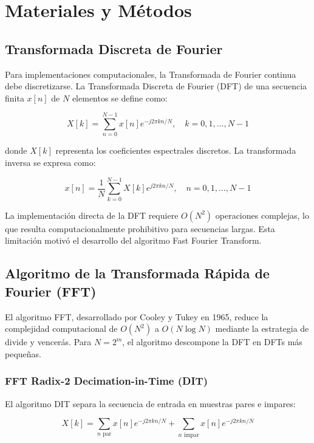 \documentclass[a4paper]{article}
\begin{document}
\section{Materiales y Métodos}

\subsection{Transformada Discreta de Fourier}

Para implementaciones computacionales, la Transformada de Fourier continua debe discretizarse. La Transformada Discreta de Fourier (DFT) de una secuencia finita $x[n]$ de $N$ elementos se define como:

\begin{equation}
X[k] = \sum_{n=0}^{N-1} x[n] e^{-j2\pi kn/N}, \quad k = 0, 1, \ldots, N-1
\end{equation}

donde $X[k]$ representa los coeficientes espectrales discretos. La transformada inversa se expresa como:

\begin{equation}
x[n] = \frac{1}{N} \sum_{k=0}^{N-1} X[k] e^{j2\pi kn/N}, \quad n = 0, 1, \ldots, N-1
\end{equation}

La implementación directa de la DFT requiere $O(N^2)$ operaciones complejas, lo que resulta computacionalmente prohibitivo para secuencias largas. Esta limitación motivó el desarrollo del algoritmo Fast Fourier Transform.

\subsection{Algoritmo de la Transformada Rápida de Fourier (FFT)}

El algoritmo FFT, desarrollado por Cooley y Tukey en 1965, reduce la complejidad computacional de $O(N^2)$ a $O(N \log N)$ mediante la estrategia de divide y vencerás. Para $N = 2^m$, el algoritmo descompone la DFT en DFTs más pequeñas.

\subsubsection{FFT Radix-2 Decimation-in-Time (DIT)}

El algoritmo DIT separa la secuencia de entrada en muestras pares e impares:

\begin{equation}
X[k] = \sum_{n \text{ par}} x[n] e^{-j2\pi kn/N} + \sum_{n \text{ impar}} x[n] e^{-j2\pi kn/N}
\end{equation}
\end{document}
